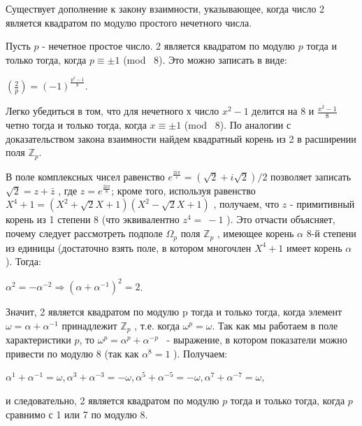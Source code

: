 \newpage

Существует дополнение к закону взаимности, указывающее, когда число 2 является квадратом по модулю простого нечетного числа.

\begin{thm}
Пусть $p$ - нечетное простое число. 2 является квадратом по модулю $p$ тогда и только тогда, когда $p \equiv \pm 1$ (mod \ 8). Это можно записать в виде:

\begin{center}
$(\frac 2p) = (-1)^{\frac{p^2 -1}{8}}$.
\end{center}
\end{thm}
\begin{myproof}

Легко убедиться в том, что для нечетного $х$ число $x^2 -1$
 делится на 8 и $\frac{x^2-1}{8}$
 четно тогда и только тогда, когда $x \equiv \pm 1$ (mod \ 8). По аналогии с доказательством закона взаимности найдем квадратный корень из 2 в расширении поля $\mathbb{Z}_p$.

В поле комплексных чисел равенство $e^{\frac{2i\pi}{e}} = (\sqrt2 + i\sqrt2)/2$
 позволяет записать $\sqrt2 = z + \bar z$
 , где $z = e^{\frac{2i\pi}{8}}$; кроме того, используя равенство $X^4+1 = (X^2 + \sqrt2 X+1)(X^2 - \sqrt2 X+1)$
 , получаем, что $z$ - примитивный корень из 1 степени 8 (что эквивалентно $z^4=~-1$
    ).
Это отчасти объясняет, почему следует рассмотреть подполе $\Omega_p$
 поля $\mathbb{Z}_p$
 , имеющее корень $\alpha$
 8-й степени из единицы (достаточно взять поле, в котором многочлен $X^4+1$
 имеет корень $\alpha$
 ). Тогда:

\begin{center}
$\alpha^2 = -\alpha^{-2} \Longrightarrow (\alpha + \alpha^{-1})^2 = 2$.
\end{center}


Значит, 2 является квадратом по модулю p тогда и только тогда, когда элемент $\omega = \alpha + \alpha^{-1}$
 принадлежит  $\mathbb{Z}_p$
 , т.е. когда $\omega^p = \omega$. Так как мы работаем в поле характеристики $p$, то $\omega^p = \alpha^p + \alpha^{-p}$
 ~- выражение, в котором показатели можно привести по модулю 8 (так как $\alpha^8=1$
    ). Получаем:

\begin{center}
$\alpha^1 + \alpha^{-1} = \omega, \alpha^3 + \alpha^{-3} = -\omega, \alpha^5 + \alpha^{-5} = -\omega, \alpha^7 + \alpha^{-7} = \omega$,
\end{center}


и следовательно, 2 является квадратом по модулю $p$ тогда и только тогда, когда $p$ сравнимо с 1 или 7 по модулю 8.
\end{myproof}

